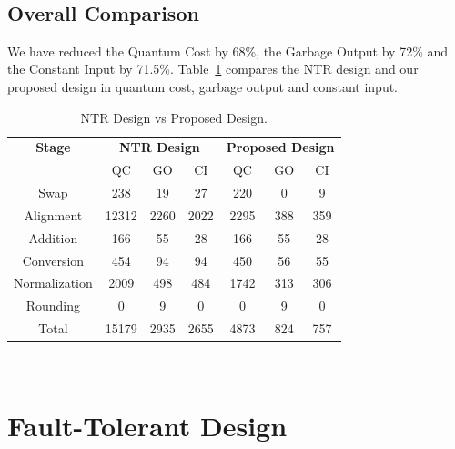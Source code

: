 \documentclass[%
reprint,
 amsmath,amssymb,
 aps,
]{revtex4-1}
\begin{document}
\begin{table}
\centering
{}
\\
\caption{NTR RLZC vs Proposed RLZC.}
\label{tab:RLZC}
\end{table}

\subsection{Overall Comparison}
We have reduced the Quantum Cost by 68\%, the Garbage Output by 72\% and the Constant Input by 71.5\%. Table~\ref{tab:total_compare} compares the NTR design and our proposed design in quantum cost, garbage output and constant input. 

\begin{table}
\centering
\begin{tabular}{|c|c|c|c|c|c|c|}
\hline
\textbf{Stage} & \multicolumn{3}{|c|}{\textbf{NTR Design}} & \multicolumn{3}{|c|}{\textbf{Proposed Design}} \\
\cline{2-7}
 & QC & GO & CI & QC & GO & CI  \\ \hline 
 Swap & 238 & 19 & 27 & 220 & 0 & 9 \\ \hline
 Alignment & 12312 & 2260 & 2022 & 2295 & 388 & 359 \\ \hline
 Addition & 166 & 55 & 28 & 166 & 55 & 28  \\ \hline
 Conversion & 454 & 94 & 94 & 450 & 56 & 55 \\ \hline
 Normalization & 2009 & 498 & 484 & 1742 & 313 &306 \\ \hline
 Rounding & 0 & 9 & 0 & 0 & 9 & 0 \\ \hline 
 Total & 15179 & 2935 & 2655 & 4873 & 824 & 757 \\ \hline 
\end{tabular}
\\
\caption{NTR Design vs Proposed Design.}
\label{tab:total_compare}
\end{table} 

\section{Fault-Tolerant Design}
\end{document}
